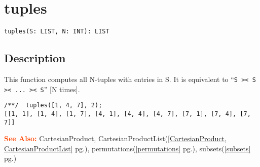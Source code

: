 \documentclass[a4paper]{mybook}
\newenvironment{command}{}{} %
\newcommand\SeeAlso{\par\textcolor{OrangeRed}{\textbf{\large See Also: }}}
\begin{document}
\section{tuples}
\label{tuples}
\begin{command} %


\begin{Verbatim}[label=syntax, rulecolor=\color{MidnightBlue},
frame=single]
tuples(S: LIST, N: INT): LIST
\end{Verbatim}


\subsection*{Description}

This function computes all N-tuples with entries in S.
It is equivalent to ``\verb&S >< S >< ... >< S&''  [N times].
\begin{Verbatim}[label=example, rulecolor=\color{PineGreen}, frame=single]
/**/  tuples([1, 4, 7], 2);
[[1, 1], [1, 4], [1, 7], [4, 1], [4, 4], [4, 7], [7, 1], [7, 4], [7, 7]]
\end{Verbatim}


\SeeAlso %
  CartesianProduct, CartesianProductList(\ref{CartesianProduct, CartesianProductList} pg.\pageref{CartesianProduct, CartesianProductList}), 
    permutations(\ref{permutations} pg.\pageref{permutations}), 
    subsets(\ref{subsets} pg.\pageref{subsets})
\end{command} %
\end{document}
